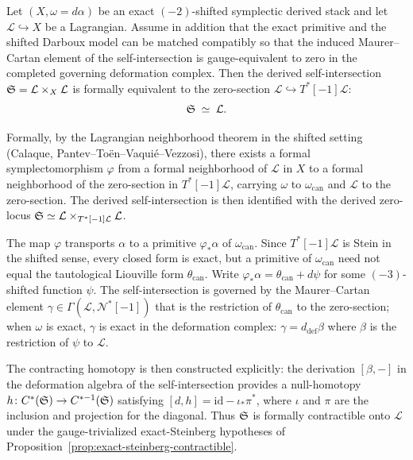 \begin{proposition}
\label{prop:exact-steinberg-contractible}
Let $(X, \omega = d\alpha)$ be an exact $(-2)$-shifted symplectic
derived stack and let $\mathcal{L} \hookrightarrow X$ be a Lagrangian.
Assume in addition that the exact primitive and the shifted Darboux model can be
matched compatibly so that the induced Maurer--Cartan element of the
self-intersection is gauge-equivalent to zero in the completed governing
deformation complex. Then the derived self-intersection
$\mathfrak{S} = \mathcal{L} \times_X \mathcal{L}$ is formally equivalent
to the zero-section $\mathcal{L} \hookrightarrow T^*[-1]\mathcal{L}$:
\[
 \mathfrak{S} \;\simeq\; \mathcal{L}.
\]
\end{proposition}

\begin{remark}
Formally, by the Lagrangian neighborhood theorem in the shifted setting
(Calaque, Pantev--To\"en--Vaqui\'e--Vezzosi), there exists a
formal symplectomorphism $\varphi$ from a formal neighborhood of
$\mathcal{L}$ in $X$ to a formal neighborhood of the zero-section
in $T^*[-1]\mathcal{L}$, carrying $\omega$ to $\omega_{\mathrm{can}}$
and $\mathcal{L}$ to the zero-section. The derived self-intersection
is then identified with the derived zero-locus
$\mathfrak{S} \simeq \mathcal{L} \times_{T^*[-1]\mathcal{L}} \mathcal{L}$.

The map $\varphi$ transports $\alpha$ to a primitive
$\varphi_*\alpha$ of $\omega_{\mathrm{can}}$. Since
$T^*[-1]\mathcal{L}$ is Stein in the shifted sense, every closed
form is exact, but a primitive of $\omega_{\mathrm{can}}$ need not
equal the tautological Liouville form $\theta_{\mathrm{can}}$.
Write $\varphi_*\alpha = \theta_{\mathrm{can}} + d\psi$ for some
$(-3)$-shifted function $\psi$. The self-intersection is governed by
the Maurer--Cartan element
$\gamma \in \Gamma(\mathcal{L}, \mathcal{N}^*[-1])$ that is the
restriction of $\theta_{\mathrm{can}}$ to the zero-section; when
$\omega$ is exact, $\gamma$ is exact in the deformation complex:
$\gamma = d_{\mathrm{def}}\beta$ where $\beta$ is the restriction
of $\psi$ to $\mathcal{L}$.

The contracting homotopy is then constructed explicitly:
the derivation $[\beta, -]$ in the deformation algebra of
the self-intersection provides a null-homotopy
$h \colon C^*(\mathfrak{S}) \to C^{*-1}(\mathfrak{S})$ satisfying
$[d, h] = \mathrm{id} - \iota_* \pi^*$, where $\iota$ and $\pi$
are the inclusion and projection for the diagonal. Thus $\mathfrak{S}$
is formally contractible onto $\mathcal{L}$ under the gauge-trivialized
exact-Steinberg hypotheses of Proposition~\ref{prop:exact-steinberg-contractible}.
\end{remark}

